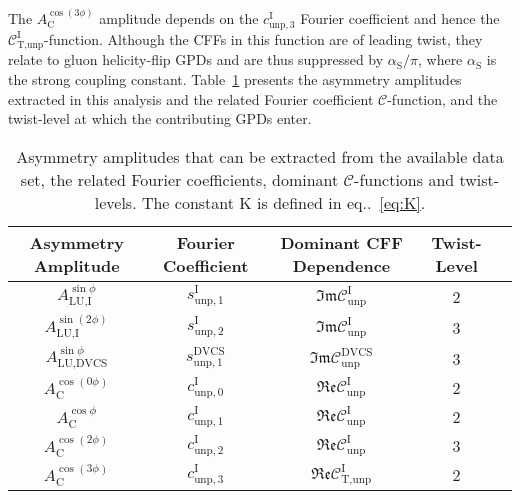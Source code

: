 The $A^{\cos(3\phi)}_{\textrm{C}}$ amplitude depends on the
$c_{\textrm{unp},3}^{\textrm{I}}$ Fourier coefficient and hence the
$\mathcal{C}_{\textrm{T,unp}}^{\textrm{I}}$-function. Although the CFFs
in this function are of leading twist, they relate to gluon helicity-flip GPDs and are thus suppressed by $\alpha_{\textrm{S}}/\pi$, where $\alpha_{\textrm{S}}$ is the strong coupling constant. Table~\ref{tab_amplitudes} presents the asymmetry amplitudes extracted in this analysis and the
related  Fourier coefficient  $\mathcal{C}$-function, and the twist-level at which the contributing GPDs enter.
\begin{table}
\begin{center}
\resizebox{\textwidth}{!} {
\begin{tabular}{|c|c|c|c|c|}
\hline
Asymmetry Amplitude& Fourier Coefficient& Dominant CFF Dependence & Twist-Level   \\ 
\hline
\hline
$A_{\textrm{LU,I}}^{\sin\phi}$ & $s_{\textrm{unp},1}^{\textrm{I}}$  &
$\mathfrak{Im}\mathcal{C}_{\textrm{unp}}^{\textrm{I}}$
&  2 \\
\hline
$A_{\textrm{LU,I}}^{\sin(2\phi)}$ & $s_{\textrm{unp},2}^{\textrm{I}}$ 
&
$\mathfrak{Im}\mathcal{C}_{\textrm{unp}}^{\textrm{I}}$
&  3 \\
\hline
\hline
$A_{\textrm{LU,DVCS}}^{\sin\phi}$ & $s_{\textrm{unp},1}^{\textrm{DVCS}}$ &
$\mathfrak{Im}\mathcal{C}_{\textrm{unp}}^{\textrm{DVCS}}$ &  3 \\
\hline
\hline
$A_{\textrm{C}}^{\cos(0\phi)}$ & $c_{\textrm{unp},0}^{\textrm{I}}$  &
$\mathfrak{Re}\mathcal{C}_{\textrm{unp}}^{\textrm{I}}$ & 2
\\
\hline
$A_{\textrm{C}}^{\cos\phi}$ & $c_{\textrm{unp},1}^{\textrm{I}}$  &
$\mathfrak{Re}\mathcal{C}_{\textrm{unp}}^{\textrm{I}}$ & 2
\\
\hline
$A_{\textrm{C}}^{\cos(2\phi)}$ & $c_{\textrm{unp},2}^{\textrm{I}}$ &
$\mathfrak{Re}\mathcal{C}_{\textrm{unp}}^{\textrm{I}}$ & 3 \\
\hline
$A_{\textrm{C}}^{\cos(3\phi)}$ & $c_{\textrm{unp},3}^{\textrm{I}}$ &
$\mathfrak{Re}\mathcal{C}_{\textrm{T,unp}}^{\textrm{I}}$ &  2 \\
\hline
 \end{tabular}
}
\caption{Asymmetry amplitudes that can
be extracted from the available data set, the related Fourier
coefficients, dominant $\mathcal{C}$-functions and twist-levels. {The constant K is defined in eq..~\ref{eq:K}}.}
\label{tab_amplitudes}
\end{center}
\end{table}
 
